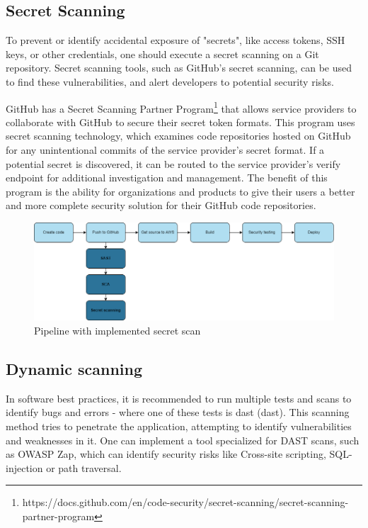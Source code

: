 \subsection{Secret Scanning}
To prevent or identify accidental exposure of "secrets", like access tokens, SSH keys, or other credentials, one should execute a secret scanning on a Git repository. Secret scanning tools, such as GitHub's secret scanning, can be used to find these vulnerabilities, and alert developers to potential security risks. \cite{GithubSecretScanning}

GitHub has a Secret Scanning Partner Program\footnote{https://docs.github.com/en/code-security/secret-scanning/secret-scanning-partner-program} that allows service providers to collaborate with GitHub to secure their secret token formats. This program uses secret scanning technology, which examines code repositories hosted on GitHub for any unintentional commits of the service provider's secret format. If a potential secret is discovered, it can be routed to the service provider's verify endpoint for additional investigation and management. The benefit of this program is the ability for organizations and products to give their users a better and more complete security solution for their GitHub code repositories. \cite{partnerprogram}


\vspace{2mm}
\begin{figure}[H]
    \centering
    \includegraphics[width=0.8\columnwidth]{Images/pipeline4.png}
    \caption{Pipeline with implemented secret scan}
    \label{fig: Pipeline with implemented secret scan}
\end{figure}

\subsection{Dynamic scanning}
In software best practices, it is recommended to run multiple tests and scans to identify bugs and errors - where one of these tests is \acrlong{dast} (\acrshort{dast}).\cite{bestpracticeSupplyChain} This scanning method tries to penetrate the application, attempting to identify vulnerabilities and weaknesses in it. One can implement a tool specialized for DAST scans, such as OWASP Zap, which can identify security risks like \gls{Cross-site scripting}, \gls{SQL-injection} or path traversal.\cite{dynamictesting}


